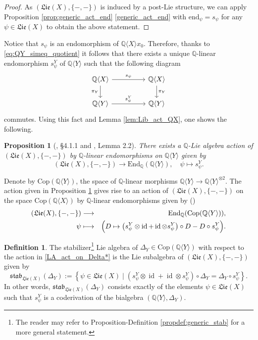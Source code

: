 \documentclass[11pt, a4paper]{amsart}
\newtheorem{proposition}[theorem]{Proposition}
\numberwithin{equation}{section}
\theoremstyle{definition}
\newtheorem{definition}[theorem]{Definition}
\newcommand{\Q}{\mathbb{Q}}
\newcommand{\QX}{\Q\langle X\rangle}
\newcommand{\QY}{\Q\langle Y\rangle}
\newcommand{\id}{\operatorname{id}}
\newcommand{\Lie}{\mathfrak{Lie}}
\newcommand{\stab}{\mathfrak{stab}}
\begin{document}
\begin{proof}
As $(\Lie(X),\{-,-\})$ is induced by a post-Lie structure, we can apply Proposition \ref{prop:generic_act_end} \ref{generic_act_end} with $\mathrm{end}_\psi = s_\psi$ for any $\psi \in \Lie(X)$ to obtain the above statement. 
\end{proof}
\noindent Notice that $s_\psi$ is an endomorphism of $\QX x_0$. Therefore, thanks to \eqref{eq:QY_simeq_quotient} it follows that there exists a unique $\Q$-linear endomorphism $s^Y_\psi$ of $\QY$ such that the following diagram
\[\begin{tikzcd}
    \QX \ar[rr, "s_\psi"] \ar[d, "\pi_Y"'] && \QX \ar[d, "\pi_Y"] \\
    \QY \ar[rr, "s^Y_\psi"] && \QY
\end{tikzcd}\]
commutes. Using this fact and Lemma \ref{lem:Lib_act_QX}, one shows the following.
\begin{proposition}[\cite{Ra02}, §4.1.1 and \cite{EF18}, Lemma 2.2] \label{prop:Lib_act_QY}
    There exists a $\Q$-Lie algebra action of $(\Lie(X), \{-,-\})$ by $\Q$-linear endomorphisms on $\QY$ given by
    \[
        (\Lie(X), \{-,-\}) \to \mathrm{End}_{\Q}(\QY), \quad \psi \mapsto s_\psi^Y.
    \]
\end{proposition}

\noindent Denote by $\mathrm{Cop}(\QY)$, the space of $\Q$-linear morphisms $\QY \to \QY^{\otimes 2}$. The action given in Proposition \ref{prop:Lib_act_QY} gives rise to an action of $(\Lie(X), \{-,-\})$ on the space $\mathrm{Cop}(\QX)$ by $\Q$-linear endomorphisms given by (\cite[§2.5]{EF18})
\begin{eqnarray}
    \label{LA_act_on_Delta*}
    (\Lie(X), \{-,-\}) & \longrightarrow & \mathrm{End}_{\Q}(\mathrm{Cop}(\QY)),
    \\
    \psi & \longmapsto & \Big( D \mapsto \left(s^Y_{\psi} \otimes \id + \id \otimes s^Y_{\psi}\right) \circ D - D \circ s^Y_{\psi}\Big). \notag
\end{eqnarray}

\begin{definition} \label{def:stab_Delta_Y}
    The stabilizer\footnote{The reader may refer to Proposition-Definition \ref{propdef:generic_stab} for a more general statement.} Lie algebra of $\Delta_Y \in \mathrm{Cop}(\QY)$ with respect to the action in \eqref{LA_act_on_Delta*} is the Lie subalgebra of $(\Lie(X), \{-,-\})$ given by
    \[
        \stab_{\Lie(X)}(\Delta_Y) := \left\{ \psi \in \Lie(X) \mid (s^Y_{\psi} \otimes \id + \id \otimes s^Y_{\psi}) \circ \Delta_Y = \Delta_Y \circ s^Y_\psi \right\}.
    \]
    In other words, $\stab_{\Lie(X)}(\Delta_Y)$ consists exactly of the elements $\psi \in \Lie(X)$ such that $s^Y_{\psi}$ is a coderivation of the bialgebra $(\QY, \Delta_Y)$.
\end{definition}
\end{document}
